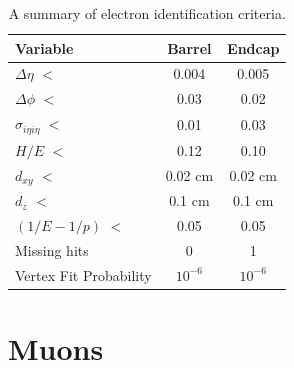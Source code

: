  \begin{table}[h]
\centering
  \caption{A summary of electron identification criteria.}
  \label{tab:eleID}
  \begin{tabular}{ l  c c}
      \hline
      \hline
      	Variable & Barrel & Endcap \\
      	\hline
    		$\Delta\eta$ $<$ &  0.004 & 0.005 \\
     	$\Delta\phi$ $<$ &  0.03 & 0.02 \\
     	$\sigma_{i\eta i\eta}$ $<$ & 0.01 & 0.03 \\
		$H/E$ $<$ & 0.12 & 0.10 \\
		$d_{xy}$ $<$ & 0.02 cm & 0.02 cm \\
		$d_{z}$ $<$  & 0.1 cm & 0.1 cm \\
		$(1/E - 1/p)$ $<$ & 0.05 & 0.05\\
		Missing hits  & 0 & 1 \\
		Vertex Fit Probability & $10^{-6}$ & $10^{-6}$ \\    	

      \hline
      \hline 
  \end{tabular}
\end{table}



\section{Muons}

